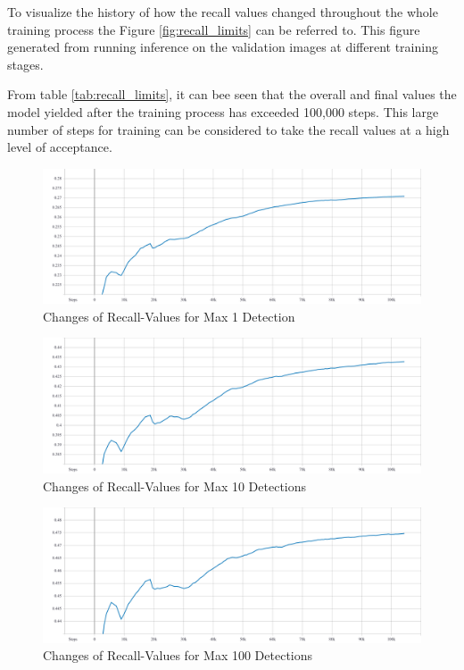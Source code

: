             \vspace{1cm}
            To visualize the history of how the recall values changed throughout the whole training process the Figure \ref{fig:recall_limits} can be referred to. This figure generated from running inference on the validation images at different training stages.
            
            \vspace{1cm}
            From table \ref{tab:recall_limits}, it can bee seen that the overall and final values the model yielded after the training process has exceeded 100,000 steps. This large number of steps for training can be considered to take the recall values at a high level of acceptance.
            
            \clearpage
            \begin{figure}
                \centering
                \includegraphics[width=\textwidth]{images/AR-1.pdf}
                \caption{Changes of Recall-Values for Max 1 Detection}
                \label{fig:recall_limits_1}
            \end{figure}
            \begin{figure}
                \centering
                \includegraphics[width=\textwidth]{images/AR-10.pdf}
                \caption{Changes of Recall-Values for Max 10 Detections}
                \label{fig:recall_limits_10}
            \end{figure}
            \begin{figure}
                \centering
                \includegraphics[width=\textwidth]{images/AR-100.pdf}
                \caption{Changes of Recall-Values for Max 100 Detections}
                \label{fig:recall_limits_100}
            \end{figure}
            
